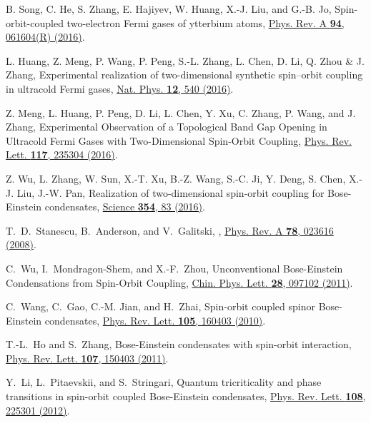 \documentclass[twocolumn,prl,floatfix,citeautoscript,nofootinbib]{revtex4}
\begin{document}
\begin{thebibliography}{99}
 B. Song, C. He, S. Zhang, E. Hajiyev, W. Huang, X.-J. Liu, and
G.-B. Jo, {Spin-orbit-coupled two-electron Fermi gases of ytterbium atoms},
\href{https://doi.org/10.1103/PhysRevA.94.061604}{Phys. Rev. A \textbf{94},
061604(R) (2016)}.

 L. Huang, Z. Meng, P. Wang, P. Peng, S.-L. Zhang, L.
Chen, D. Li, Q. Zhou \& J. Zhang, {Experimental realization of
two-dimensional synthetic spin--orbit coupling in ultracold Fermi gases},
\href{https://doi.org/doi:10.1038/nphys3672}{Nat. Phys. \textbf{12}, 540
(2016)}.

 Z. Meng, L. Huang, P. Peng, D. Li, L. Chen, Y. Xu, C.
Zhang, P. Wang, and J. Zhang, {Experimental Observation of a Topological
Band Gap Opening in Ultracold Fermi Gases with Two-Dimensional Spin-Orbit
Coupling}, \href{https://doi.org/10.1103/PhysRevLett.117.235304}{Phys. Rev.
Lett. \textbf{117}, 235304 (2016)}.

 Z. Wu, L. Zhang, W. Sun, X.-T. Xu, B.-Z. Wang, S.-C. Ji,
Y. Deng, S. Chen, X.-J. Liu, J.-W. Pan, {Realization of two-dimensional
spin-orbit coupling for Bose-Einstein condensates}, \href{https://doi.org/10.1126/Science.aaf6689}%
{ Science \textbf{354}, 83 (2016)}.

 T.~D.~Stanescu, B.~Anderson, and V.~Galitski, %
, \newblock \href{http://dx.doi.org/10.1103/PhysRevA.78.023616}%
{Phys. Rev. A \textbf{78}, 023616 (2008)}.

 C.~Wu, I.~Mondragon-Shem, and X.-F.~Zhou, \newblock
{Unconventional Bose-Einstein Condensations from Spin-Orbit Coupling}, %
\newblock \href{http://dx.doi.org/10.1088/0256-307X/28/9/097102}{Chin. Phys.
Lett. \textbf{28}, 097102 (2011)}.

 C.~Wang, C.~Gao, C.-M. Jian, and H.~Zhai, \newblock %
Spin-orbit coupled spinor Bose-Einstein condensates, \newblock \href{http://dx.doi.org/10.1103/PhysRevLett.105.160403}%
{Phys. Rev. Lett. \textbf{105}, 160403 (2010)}.

 T.-L.~Ho and S.~Zhang, \newblock Bose-Einstein
condensates with spin-orbit interaction, \newblock \href{http://dx.doi.org/10.1103/PhysRevLett.107.150403}%
{Phys. Rev. Lett. \textbf{107}, 150403 (2011)}.

 Y.~Li, L.~Pitaevskii, and S.~Stringari, \newblock %
Quantum tricriticality and phase transitions in spin-orbit coupled
Bose-Einstein condensates, \newblock \href{http://dx.doi.org/10.1103/PhysRevLett.108.225301}%
{Phys. Rev. Lett. \textbf{108}, 225301 (2012)}.


\end{thebibliography}
\end{document}

